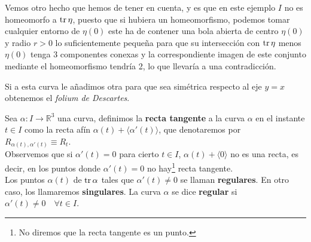 \begin{ejemplo}
\begin{enumerate}
            Vemos otro hecho que hemos de tener en cuenta, y es que en este ejemplo $I$ no es homeomorfo a $\operatorname{tr} \eta$, puesto que si hubiera un homeomorfismo, podemos tomar cualquier entorno de $\eta(0)$ este ha de contener una bola abierta de centro $\eta(0)$ y radio $r>0$ lo suficientemente pequeña para que su intersección con $\operatorname{tr} \eta$ menos $\eta(0)$ tenga 3 componentes conexas y la correspondiente imagen de este conjunto mediante el homeomorfismo tendría 2, lo que llevaría a una contradicción.

            Si a esta curva le añadimos otra para que sea simétrica respecto al eje $y=x$ obtenemos el \textit{folium de Descartes}.
    \end{enumerate}
\end{ejemplo}

\begin{definicion}
    Sea $\alpha:I\to \mathbb{R}^3$ una curva, definimos la \textbf{recta tangente} a la curva $\alpha$ en el instante $t\in I$ como la recta afín $\alpha(t) + \langle \alpha'(t) \rangle $, que denotaremos por $R_{\alpha(t),\alpha'(t)} \equiv R_t$.\\

    \noindent
    Observemos que si $\alpha'(t) = 0$ para cierto $t\in I$, $\alpha(t) + \langle 0 \rangle $ no es una recta, es decir, en los puntos donde $\alpha'(t) = 0$ no hay\footnote{No diremos que la recta tangente es un punto.} recta tangente.\\

    \noindent
    Los puntos $\alpha(t)$ de $\operatorname{tr} \alpha$ tales que $\alpha'(t) \neq 0$ se llaman \textbf{regulares}. En otro caso, los llamaremos \textbf{singulares}. La curva $\alpha$ se dice \textbf{regular} si $\alpha'(t)\neq 0 \quad \forall t\in I$.
\end{definicion}

